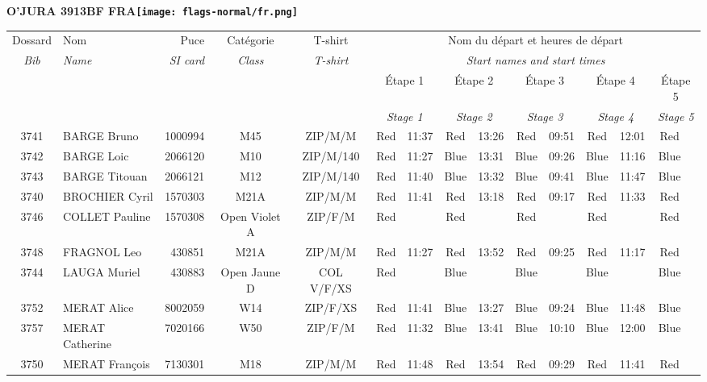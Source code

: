 \documentclass{report}
\begin{document}
\newpage
  \Huge \centering \bfseries O'JURA 3913BF FRA\normalfont \footnotesize \sffamily \hfill \texttt{[image: flags-normal/fr.png]} \newline 
  \begin{longtable}{|c|l|r|c|c|*{5}{cc|}}
    Dossard & Nom  & Puce    & Catégorie & T-shirt & \multicolumn{10}{c|}{Nom du départ et heures de départ} \\
    \itshape Bib     & \itshape Name & \itshape SI card & \itshape Class  & \itshape  T-shirt  & \multicolumn{10}{c|}{\itshape Start names and start times} \\
    \hline
    & & & & & \multicolumn{2}{c|}{Étape 1} & \multicolumn{2}{c|}{Étape 2} & \multicolumn{2}{c|}{Étape 3} & \multicolumn{2}{c|}{Étape 4} & \multicolumn{2}{c|}{Étape 5} \\
    & & & & & \multicolumn{2}{c|}{\itshape Stage 1} & \multicolumn{2}{c|}{\itshape Stage 2} & \multicolumn{2}{c|}{\itshape Stage 3} & \multicolumn{2}{c|}{\itshape Stage 4} & \multicolumn{2}{c|}{\itshape Stage 5} \\
    \hline
    3741 & BARGE Bruno & 1000994 & M45 & ZIP/M/M & Red & 11:37 & Red & 13:26 & Red & 09:51 & Red & 12:01 & Red &  \\
    3742 & BARGE Loic & 2066120 & M10 & ZIP/M/140 & Red & 11:27 & Blue & 13:31 & Blue & 09:26 & Blue & 11:16 & Blue &  \\
    3743 & BARGE Titouan & 2066121 & M12 & ZIP/M/140 & Red & 11:40 & Blue & 13:32 & Blue & 09:41 & Blue & 11:47 & Blue &  \\
    3740 & BROCHIER Cyril & 1570303 & M21A & ZIP/M/M & Red & 11:41 & Red & 13:18 & Red & 09:17 & Red & 11:33 & Red &  \\
    3746 & COLLET Pauline & 1570308 & Open Violet A & ZIP/F/M & Red &   & Red &   & Red &   & Red &   & Red &  \\
    3748 & FRAGNOL Leo & 430851 & M21A & ZIP/M/M & Red & 11:27 & Red & 13:52 & Red & 09:25 & Red & 11:17 & Red &  \\
    3744 & LAUGA Muriel & 430883 & Open Jaune D & COL V/F/XS & Red &   & Blue &   & Blue &   & Blue &   & Blue &  \\
    3752 & MERAT Alice & 8002059 & W14 & ZIP/F/XS & Red & 11:41 & Blue & 13:27 & Blue & 09:24 & Blue & 11:48 & Blue &  \\
    3757 & MERAT Catherine & 7020166 & W50 & ZIP/F/M & Red & 11:32 & Blue & 13:41 & Blue & 10:10 & Blue & 12:00 & Blue &  \\
    3750 & MERAT François & 7130301 & M18 & ZIP/M/M & Red & 11:48 & Red & 13:54 & Red & 09:29 & Red & 11:41 & Red &  \\

\end{longtable}
\end{document}
